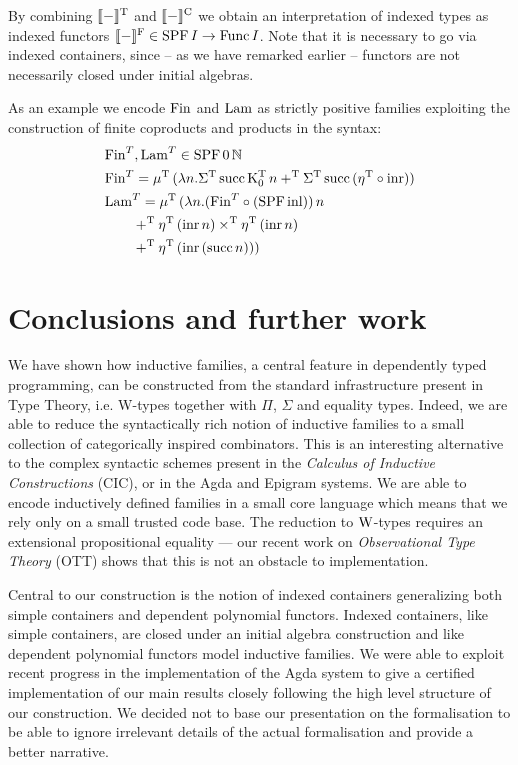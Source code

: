 \documentclass[10pt, conference, compsocconf]{IEEEtran}
\begin{document}
By combining $\llbracket-\rrbracket^{\mathrm T}$ and $\llbracket-\rrbracket^{\mathrm C}$ we obtain an interpretation of
indexed types as indexed functors $\llbracket-\rrbracket^{\mathrm F} \in \mathrm{SPF}\,I\to\mathrm{Func}\,I$.
Note that it is necessary to go via indexed containers, since -- as we
have remarked earlier -- functors are not necessarily closed under initial
algebras.

As an example we encode $\mathrm{Fin}$ and $\mathrm{Lam}$ as strictly positive
families exploiting the construction of finite coproducts and
products in the syntax:
\begin{align*}
  &\mathrm{Fin}^T, \mathrm{Lam}^T \in \mathrm{SPF}\,0\,\mathbb{N}\\
  &\mathrm{Fin}^T = \mu^\mathrm{T}\,(\lambda n.\Sigma^\mathrm{T}\,\mathrm{succ}\,\textrm{K}^\mathrm{T}_0\,n 
  +^\mathrm{T} \Sigma^\mathrm{T}\,\mathrm{succ}\,({\eta}^{\mathrm T} \circ \mathrm{inr}))\\
  &\mathrm{Lam}^T = \mu^\mathrm{T}\,(\lambda n.(\mathrm{Fin}^T \circ (\mathrm{SPF}\,\mathrm{inl}))\,n\\
  &\qquad +^\mathrm{T} {\eta}^{\mathrm T}\,(\mathrm{inr}\,n) \times^\mathrm{T} {\eta}^{\mathrm T}\,(\mathrm{inr}\,n)\\
  &\qquad +^\mathrm{T} {\eta}^{\mathrm T}\,(\mathrm{inr}\,(\mathrm{succ}\,n)))
\end{align*}

\section{Conclusions and further work}
\label{sec:concl-furth-work}

We have shown how inductive families, a central feature in dependently
typed programming, can be constructed from the standard infrastructure
present in Type Theory, i.e. W-types together with $\Pi$, $\Sigma$ and
equality types. Indeed, we are able to reduce the syntactically rich
notion of inductive families to a small collection of categorically
inspired combinators. This is an interesting alternative to the
complex syntactic schemes present in the \emph{Calculus of Inductive
  Constructions} (CIC), or in the Agda and Epigram systems. We are
able to encode inductively defined families in a small core language
which means that we rely only on a small trusted code base. The
reduction to $\mathrm{W}$-types requires an extensional propositional
equality --- our recent work on \emph{Observational Type Theory} (OTT) 
\cite{alti:ott-conf} shows that this is not an obstacle to implementation.

Central to our construction is the notion of indexed containers
generalizing both simple containers and dependent polynomial functors. 
Indexed containers, like simple containers, are closed under an initial
algebra construction and like dependent polynomial functors model
inductive families. We were able to exploit recent progress in the
implementation of the Agda system to give a certified implementation
of our main results closely following the high level structure of our
construction. We decided not to base our presentation on the
formalisation to be able to ignore irrelevant details of the actual
formalisation and provide a better narrative.
\end{document}
